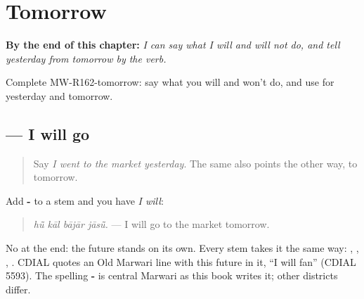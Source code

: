 
\chapter{Tomorrow}
\label{ch:mw-a2-tomorrow}

\begin{chapteropening}
\textbf{By the end of this chapter:} \emph{I can say what I will and will not do, and tell yesterday from tomorrow by the verb.}

Complete MW-R162-tomorrow: say what you will and won't do, and use  for yesterday and tomorrow.
\end{chapteropening}

\section[\texorpdfstring{\mw{जासूं} (jāsū̃)}{जासूं (jāsū̃)}]{   — I will go}

\label{lesson:MW-C162-jasu}



\begin{quote}
Say \emph{I went to the market yesterday}. The same \textbf{} also points the other way, to tomorrow.
\end{quote}

\begin{grammarlens}[title={Grammar Lens: -\mw{सूं}}]
Add \textbf{-} to a stem and you have \emph{I will}:

\begin{quote}
\textbf{   }
\end{quote}

\begin{quote}
\emph{hū̃ kāl bājār jāsū̃.} — I will go to the market tomorrow.
\end{quote}

No \textbf{} at the end: the future stands on its own. Every stem takes it the same way: \textbf{}, \textbf{}, \textbf{}, \textbf{}. CDIAL quotes an Old Marwari line with this future in it, \textquotedblleft{}I will fan\textquotedblright{} (CDIAL 5593). The spelling \textbf{-} is central Marwari as this book writes it; other districts differ.
\end{grammarlens}

